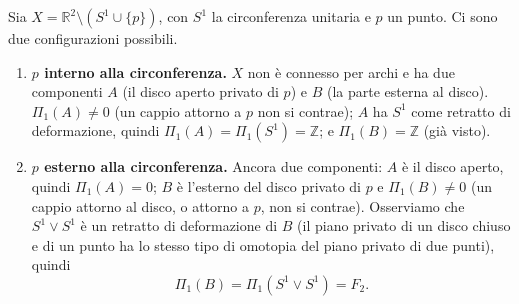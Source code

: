 \begin{ejemplo}
Sia $X = \mathbb{R}^2 \setminus (S^1 \cup \{p\})$, con $S^1$ la circonferenza unitaria e $p$ un punto. Ci sono due configurazioni possibili.

\begin{center}
\end{center}

\begin{enumerate}
    \item \textbf{$p$ interno alla circonferenza.} $X$ non \`e connesso per archi e ha due componenti $A$ (il disco aperto privato di $p$) e $B$ (la parte esterna al disco). $\Pi_1(A) \neq 0$ (un cappio attorno a $p$ non si contrae); $A$ ha $S^1$ come retratto di deformazione, quindi $\Pi_1(A) = \Pi_1(S^1) = \mathbb{Z}$; e $\Pi_1(B) = \mathbb{Z}$ (gi\`a visto).
    \item \textbf{$p$ esterno alla circonferenza.} Ancora due componenti: $A$ \`e il disco aperto, quindi $\Pi_1(A) = 0$; $B$ \`e l'esterno del disco privato di $p$ e $\Pi_1(B) \neq 0$ (un cappio attorno al disco, o attorno a $p$, non si contrae). Osserviamo che $S^1 \vee S^1$ \`e un retratto di deformazione di $B$ (il piano privato di un disco chiuso e di un punto ha lo stesso tipo di omotopia del piano privato di due punti), quindi
    \[
    \Pi_1(B) = \Pi_1(S^1 \vee S^1) = F_2 .
    \]
\end{enumerate}
\end{ejemplo}


